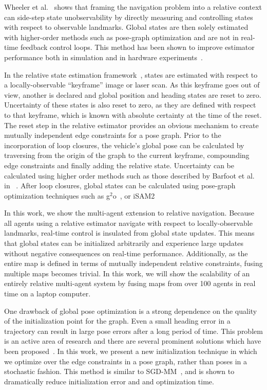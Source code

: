 Wheeler et al.~\cite{Wheeler2017a} shows that framing the navigation problem into a relative context can side-step state unobservability by directly measuring and controlling states with respect to observable landmarks.  Global states are then solely estimated with higher-order methods such as pose-graph optimization and are not in real-time feedback control loops.  This method has been shown to improve estimator performance both in simulation and in hardware experiments~\cite{Wheeler2017a, Wheeler2017b}.

In the relative state estimation framework~\cite{Koch2017}, states are estimated with respect to a locally-observable ``keyframe'' image or laser scan.  As this keyframe goes out of view, another is declared and global position and heading states are reset to zero.  Uncertainty of these states is also reset to zero, as they are defined with respect to that keyframe, which is known with absolute certainty at the time of the reset.  The reset step in the relative estimator provides an obvious mechanism to create mutually independent edge constraints for a pose graph.  Prior to the incorporation of loop closures, the vehicle's global pose can be calculated by traversing from the origin of the graph to the current keyframe, compounding edge constraints and finally adding the relative state.  Uncertainty can be calculated using higher order methods such as those described by Barfoot et al. in ~\cite{Barfoot2014}.
After loop closures, global states can be calculated using pose-graph optimization techniques such as g$^2$o~\cite{Kummerle2011}, or iSAM2~\cite{Kaess2012}

In this work, we show the multi-agent extension to relative navigation.  Because all agents using a relative estimator navigate with respect to locally-observable landmarks, real-time control is insulated from global state updates.  This means that global states can be initialized arbitrarily and experience large updates without negative consequences on real-time performance. Additionally, as the entire map is defined in terms of mutually independent relative constraints, fusing multiple maps becomes trivial.  In this work, we will show the scalability of an entirely relative multi-agent system by fusing maps from over 100 agents in real time on a laptop computer.

One drawback of global pose optimization is a strong dependence on the quality of the initialization point for the graph.  Even a small heading error in a trajectory can result in large pose errors after a long period of time.  This problem is an active area of research and there are several prominent solutions which have been proposed~\cite{Carlone2015, Kim2010a, Agarwal2014, Wang2014}.  In this work, we present a new initialization technique in which we optimize over the edge constraints in a pose graph, rather than poses in a stochastic fashion. This method is similar to SGD-MM~\cite{Wang2014}, and is shown to dramatically reduce initialization error and and optimization time.
